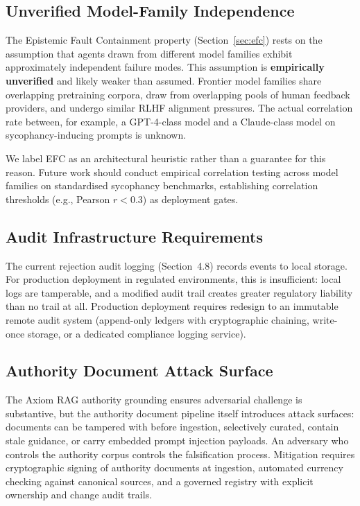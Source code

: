 \documentclass[11pt,a4paper]{article}
\begin{document}
\subsection{Unverified Model-Family Independence}
  \label{sec:model-independence}

The Epistemic Fault Containment property (Section~\ref{sec:efc})
rests on the assumption that agents drawn from different model
families exhibit approximately independent failure modes.  This
assumption is \textbf{empirically unverified} and likely weaker than
assumed.  Frontier model families share overlapping pretraining
corpora, draw from overlapping pools of human feedback providers, and
undergo similar RLHF alignment pressures.  The actual correlation
rate between, for example, a GPT-4-class model and a Claude-class
model on sycophancy-inducing prompts is unknown.

We label EFC as an architectural heuristic rather than a guarantee
for this reason.  Future work should conduct empirical correlation
testing across model families on standardised sycophancy benchmarks,
establishing correlation thresholds (e.g., Pearson $r < 0.3$) as
deployment gates.

\subsection{Audit Infrastructure Requirements}

The current rejection audit logging (Section~4.8) records events to
local storage.  For production deployment in regulated environments,
this is insufficient: local logs are tamperable, and a modified audit
trail creates greater regulatory liability than no trail at all.
Production deployment requires redesign to an immutable remote audit
system (append-only ledgers with cryptographic chaining, write-once
storage, or a dedicated compliance logging service).

\subsection{Authority Document Attack Surface}

The Axiom RAG authority grounding ensures adversarial challenge is
substantive, but the authority document pipeline itself introduces
attack surfaces: documents can be tampered with before ingestion,
selectively curated, contain stale guidance, or carry embedded prompt
injection payloads.  An adversary who controls the authority corpus
controls the falsification process.  Mitigation requires
cryptographic signing of authority documents at ingestion, automated
currency checking against canonical sources, and a governed registry
with explicit ownership and change audit trails.
\end{document}
